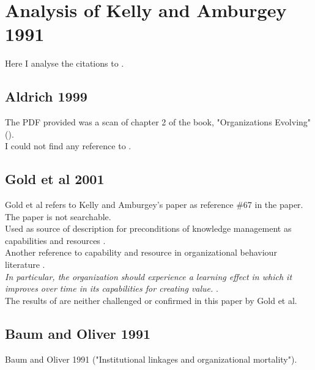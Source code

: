 \section{Analysis of Kelly and Amburgey 1991}

Here I analyse the citations to \cite{kelly1991organizational}.\\

\subsection{Aldrich 1999}

The PDF provided was a scan of chapter 2 of the book, "Organizations Evolving" (\cite{aldrich1999organizations}). \\

I could not find any reference to \cite{kelly1991organizational}.\\

\subsection{Gold et al 2001}

Gold et al \cite{gold2001knowledge} refers to Kelly and Amburgey's paper as reference \#67 in the paper. The paper is not searchable. \\

Used as source of description for preconditions of knowledge management as capabilities and resources \cite[p.186]{gold2001knowledge}.\\

Another reference to capability and resource in organizational behaviour literature \cite[p.192]{gold2001knowledge}.\\

\textit{In particular, the organization should experience a learning effect in which it improves over time in its capabilities for creating value.} \cite[p.196]{gold2001knowledge}.\\

The results of \cite{kelly1991organizational} are neither challenged or confirmed in this paper by Gold et al. \\

\subsection{Baum and Oliver 1991}

Baum and Oliver 1991 \cite{baum1991institutional} ("Institutional linkages and organizational mortality").\\

